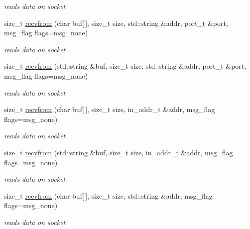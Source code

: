 \begin{CompactItemize}
\begin{CompactItemize}
\begin{CompactList}\small\item\em reads data on socket \item\end{CompactList}\item 
size\_\-t \hyperlink{classsocketpp_1_1BaseSocket_9cc42afe664fc31970e166a3b2ea0591}{recvfrom} (char buf\mbox{[}$\,$\mbox{]}, size\_\-t size, std::string \&addr, port\_\-t \&port, msg\_\-flag flags=msg\_\-none)
\begin{CompactList}\small\item\em reads data on socket \item\end{CompactList}\item 
size\_\-t \hyperlink{classsocketpp_1_1BaseSocket_b6059e85a3c981f39ec3b464d717d633}{recvfrom} (std::string \&buf, size\_\-t size, std::string \&addr, port\_\-t \&port, msg\_\-flag flags=msg\_\-none)
\begin{CompactList}\small\item\em reads data on socket \item\end{CompactList}\item 
size\_\-t \hyperlink{classsocketpp_1_1BaseSocket_0d4fad99bfe9601866a974f57c9f0370}{recvfrom} (char buf\mbox{[}$\,$\mbox{]}, size\_\-t size, in\_\-addr\_\-t \&addr, msg\_\-flag flags=msg\_\-none)
\begin{CompactList}\small\item\em reads data on socket \item\end{CompactList}\item 
size\_\-t \hyperlink{classsocketpp_1_1BaseSocket_723f0c1b9325ef3be7c97f520e6bc775}{recvfrom} (std::string \&buf, size\_\-t size, in\_\-addr\_\-t \&addr, msg\_\-flag flags=msg\_\-none)
\begin{CompactList}\small\item\em reads data on socket \item\end{CompactList}\item 
size\_\-t \hyperlink{classsocketpp_1_1BaseSocket_5ee0ad55fa03ca79a879e1d73670ede9}{recvfrom} (char buf\mbox{[}$\,$\mbox{]}, size\_\-t size, std::string \&addr, msg\_\-flag flags=msg\_\-none)
\begin{CompactList}\small\item\em reads data on socket \item\end{CompactList}\item 

\end{CompactItemize}
\end{CompactItemize}
